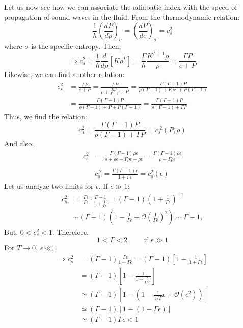 \documentclass[12pt]{report}
\begin{document}
	Let us now see how we can associate the adiabatic index with the speed of propagation of sound waves in the fluid. From the thermodynamic relation:
	\begin{equation}\frac{1}{h}\left(\frac{dP}{d\rho}\right)_\sigma = \left(\frac{dP}{de}\right)_\sigma = c_s^2 \end{equation}
	where $\sigma$ is the specific entropy. Then,
	\begin{equation}
		\Rightarrow c_s^2 = \frac{1}{h}\frac{d}{d\rho}\left[K \rho^\Gamma\right] = \frac{\Gamma}{h} \frac{K^{\Gamma-1} \rho}{ \rho} = \frac{\Gamma P}{e + P}
	\end{equation}
	Likewise, we can find another relation:
	\begin{align}
		c_s^2 &= \frac{\Gamma P}{e + P} = \frac{\Gamma P}{\rho + \frac{K\rho^\Gamma}{\Gamma-1} + P} = \frac{\Gamma (\Gamma-1)P}{\rho(\Gamma-1) + K\rho^\Gamma + P(\Gamma-1)} \nonumber \\
		&= \frac{\Gamma (\Gamma-1) P}{\rho(\Gamma-1) + P + P(\Gamma-1)} = \frac{\Gamma (\Gamma-1) P}{\rho(\Gamma-1) + \Gamma P}
	\end{align}
	Thus, we find the relation:
	\begin{equation}\boxed{c_s^2 = \frac{\Gamma (\Gamma-1) P}{\rho(\Gamma-1) + \Gamma P}= c_s^{\;2}(P,\rho)}\end{equation}
	And also,
	\begin{align}c_s^2 &= \frac{\Gamma(\Gamma-1)\rho \epsilon}{\rho + \rho \epsilon + \Gamma\rho \epsilon - \rho \epsilon} = \frac{\Gamma(\Gamma-1)\rho \epsilon}{\rho + \Gamma\rho \epsilon} \nonumber \\ & \nonumber \\
		& \boxed{c_s^{\;2}= \frac{\Gamma(\Gamma-1)\epsilon}{1 + \Gamma \epsilon} = c_s^2(\epsilon)}
	\end{align}
	Let us analyze two limits for $\epsilon$. If  $\epsilon \gg 1$:
	\begin{align*}c_s^2 &= \frac{\Gamma \epsilon}{\Gamma \epsilon} \cdot \frac{\Gamma-1}{1 + \frac{1}{\Gamma \epsilon}} = (\Gamma-1)\left(1 + \frac{1}{\Gamma \epsilon}\right)^{-1}\\
		&\sim (\Gamma-1)\left(1 - \frac{1}{\Gamma \epsilon} + \mathcal{O}\left(\frac{1}{\Gamma \epsilon}\right)^2\right) \sim \Gamma-1,\end{align*}
	But, $0 < c_s^2 < 1$. Therefore, 
	\begin{equation}
		\boxed{1 < \Gamma < 2\qquad \text { if }\epsilon \gg 1}
	\end{equation}
	For $T \to 0$, $\epsilon \ll 1$
	\begin{align*}
		\Rightarrow c_s^2 &= (\Gamma-1)\frac{\Gamma \epsilon}{1+\Gamma \epsilon} = (\Gamma-1)\left[1-\frac{1}{1+\Gamma \epsilon}\right] \\
		&= (\Gamma-1)\left[1-\frac{1}{1+\frac{\epsilon}{1/\Gamma}}\right] \\
		&\simeq (\Gamma-1)\left[1-\left(1-\frac{1}{1/\Gamma}\epsilon + \mathcal{O}(\epsilon^2)\right)\right] \\
		&\simeq (\Gamma-1)\left[1-(1-\Gamma \epsilon)\right] \\
		&\simeq (\Gamma-1)\Gamma \epsilon < 1
	\end{align*}
	
\end{document}
